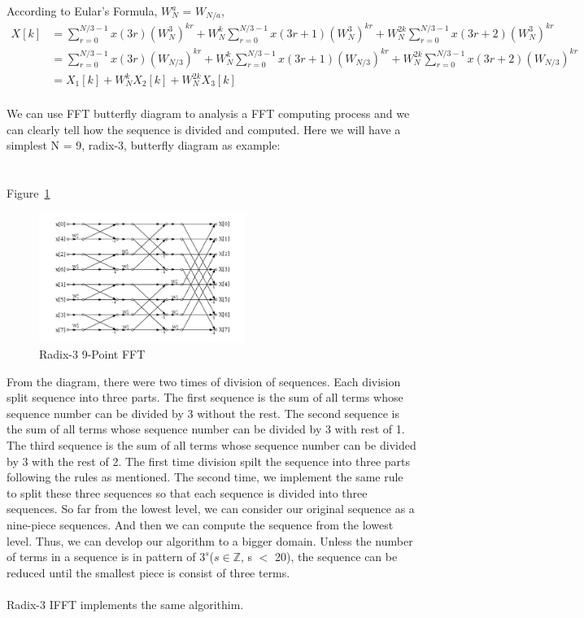 \documentclass[12pt]{article}
\begin{document}
According to Eular's Formula, $W_{N}^{a}$ = $W_{N/a}$,\\

\begin{align*}
X[k] & =  \sum\limits_{r=0}^{N/3 -1}x(3r)(W_{N}^{3})^{kr} + W_{N}^{k}\sum\limits_{r=0}^{N/3 -1}x(3r+1)(W_{N}^{3})^{kr} + W_{N}^{2k}\sum\limits_{r=0}^{N/3 -1}x(3r+2)(W_{N}^{3})^{kr}\\
& = \sum\limits_{r=0}^{N/3 -1}x(3r)(W_{N/3})^{kr} + W_{N}^{k}\sum\limits_{r=0}^{N/3 -1}x(3r+1)(W_{N/3})^{kr} + W_{N}^{2k}\sum\limits_{r=0}^{N/3 -1}x(3r+2)(W_{N/3})^{kr}\\
& = X_1[k] + W_N^kX_2[k] + W_N^{2k}X_3[k]\\
\end{align*}

We can use FFT butterfly diagram to analysis a FFT computing process and we can clearly tell how the sequence is divided and computed. Here we will have a simplest
N = 9, radix-3, butterfly diagram as example:\\
\\
\\
Figure~\ref{Fig_Radix-3FFT}

\begin{figure}[h!]
\begin{center}
 \includegraphics[width=0.6\textwidth]{butterflyRedix3}
\caption{Radix-3 9-Point FFT}
\label{Fig_Radix-3FFT}
\end{center}
\end{figure}

From the diagram, there were two times of division of sequences. Each division split sequence into three parts. The first sequence is the sum of all terms whose sequence number can be divided by 3 without the rest. The second sequence is the sum of all terms whose sequence number can be divided by 3 with rest of 1. The third sequence is the sum of all terms whose sequence number can be divided by 3 with the rest of 2. The first time division spilt the sequence into three parts following the rules as mentioned. The second time, we implement the same rule to split these three sequences so that each sequence is divided into three sequences. So far from the lowest level, we can consider our original sequence as a nine-piece sequences. And then we can compute the sequence from the lowest level. Thus, we can develop our algorithm to a bigger domain. Unless the number of terms
in a sequence is in pattern of  $3^s$($s\in\mathbb{Z}$, s $<$ 20), the sequence can be reduced until the smallest piece is consist of three terms.\\
\\
Radix-3 IFFT implements the same algorithim.\\
\end{document}

